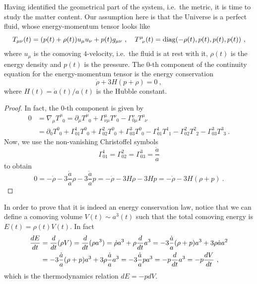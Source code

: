     Having identified the geometrical part of the system, i.e.~the metric, it is time to study the matter content. Our assumption here is that the Universe is a perfect fluid, whose energy-momentum tensor looks like 
    \begin{equation*}
        T_{\mu\nu} (t) = (p (t) + \rho(t) ) u_\mu u_\nu + p (t) g_{\mu\nu} ~, \quad T^{\mu}_{\phantom \mu \nu} (t) = \diag (- \rho(t), p(t), p(t), p(t)) ~,
    \end{equation*}
    where $u_\mu$ is the comoving $4$-velocity, i.e.~the fluid is at rest with it, $\rho(t)$ is the energy density and $p(t)$ is the pressure. The $0$-th component of the continuity equation for the energy-momentum tensor is the energy conservation 
    \begin{equation*}
        \dot \rho + 3 H (p + \rho) = 0 ~,
    \end{equation*}
    where $H (t) = \dot a(t) / a(t)$ is the Hubble constant. 
    \begin{proof}
        In fact, the $0$-th component is given by
        \begin{equation*}
        \begin{aligned}
            0 & = \nabla_\mu T^{\mu}_{\phantom \mu 0} = \partial_\mu T^{\mu}_{\phantom \mu 0} + \Gamma^\mu_{\nu \mu} T^{\nu}_{\phantom \nu 0} - \Gamma^\nu_{0 \mu} T^{\mu}_{\phantom \mu \nu} \\ & = \partial_0 T^{0}_{\phantom 0 0} + \Gamma^1_{0 1} T^{0}_{\phantom 0 0} + \Gamma^2_{0 2} T^{0}_{\phantom 0 0} + \Gamma^3_{0 3} T^{0}_{\phantom 0 0} - \Gamma^1_{0 1} T^{1}_{\phantom 11} - \Gamma^2_{0 2} T^{2}_{\phantom 2 2} - \Gamma^3_{0 3} T^{3}_{\phantom 33} ~.
        \end{aligned}
        \end{equation*}
        Now, we use the non-vanishing Christoffel symbols 
        \begin{equation*}
            \Gamma^1_{0 1} = \Gamma^2_{0 2} = \Gamma^3_{0 3} = \frac{\dot a}{a}  
        \end{equation*}
        to obtain
        \begin{equation*}
            0 = - \dot \rho - 3 \frac{\dot a}{a}  \rho - 3 \frac{\dot a}{a} p =  - \dot \rho - 3 H \rho - 3 H p = - \dot \rho - 3 H (\rho + p) ~.
        \end{equation*}
    \end{proof}
    \noindent In order to prove that it is indeed an energy conservation law, notice that we can define a comoving volume $V(t) \sim a^3(t)$ such that the total comoving energy is $E(t) = \rho(t) V(t)$. In fact
    \begin{equation*}
    \begin{aligned}
        \frac{dE}{dt} & = \frac{d}{dt} (\rho V) = \frac{d}{dt} (\rho a^3) = \dot \rho a^3 + \rho \frac{d}{dt} a^3 = - 3 \frac{\dot a}{a} (\rho + p) a^3 + 3 \rho \dot a a^2 \\ & = - 3 \frac{\dot a}{a} (\rho + p) a^3 + 3 \rho \frac{\dot a}{a} a^3 = - 3 \frac{\dot a}{a} p a^3 = - p \frac{d}{dt} a^3 = - p \frac{dV}{dt} ~,
    \end{aligned}
    \end{equation*}
    which is the thermodynamics relation $dE = - p dV$.

